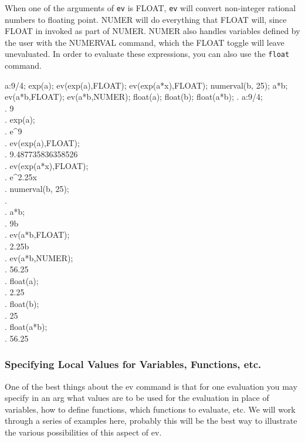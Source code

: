 When one of the arguments of \texttt{ev} is FLOAT, \texttt{ev} will
convert non-integer rational numbers to floating point. NUMER will
do everything that FLOAT will, since FLOAT in invoked as part of NUMER.
NUMER also handles variables defined by the user with the NUMERVAL command,
which the FLOAT toggle will leave unevaluated.  In order to evaluate these
expressions, you can also use the \texttt{float} command.

\vspace{3ex}

\label{FLOAT/NUMER example (Example 9)}

\beginmaximasession
a:9/4;
exp(a);
ev(exp(a),FLOAT);
ev(exp(a*x),FLOAT);
numerval(b, 25);
a*b;
ev(a*b,FLOAT);
ev(a*b,NUMER);
float(a);
float(b);
float(a*b);
\maximatexsession
{}.  a:9/4; \\
.   {{9}} \\
.  exp(a); \\
.   e^{{{9}}} \\
.  ev(exp(a),FLOAT); \\
.   9.487735836358526 \\
.  ev(exp(a*x),FLOAT); \\
.   e^{2.25\*x} \\
.  numerval(b, 25); \\
.   \left[ b \right]  \\
.  a*b; \\
.   {{9\*b}} \\
.  ev(a*b,FLOAT); \\
.   2.25\*b \\
.  ev(a*b,NUMER); \\
.   56.25 \\
.  float(a); \\
.   2.25 \\
.  float(b); \\
.   25 \\
.  float(a*b); \\
.   56.25 \\
\endmaximasession

\vspace{3ex}

\subsubsection{Specifying Local Values for Variables, Functions, etc.}

One of the best things about the ev command is that for one evaluation
you may specify in an arg what values are to be used for the evaluation
in place of variables, how to define functions, which functions to
evaluate, etc. We will work through a series of examples here, probably
this will be the best way to illustrate the various possibilities
of this aspect of ev.

